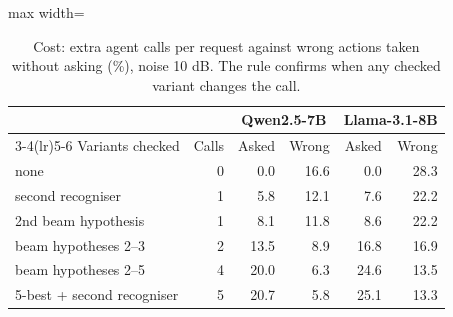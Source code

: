 \begin{table}[t]\centering\small\setlength{\tabcolsep}{4pt}
\begin{adjustbox}{max width=\linewidth}\begin{tabular}{lrrrrr}\toprule
 & & \multicolumn{2}{c}{Qwen2.5-7B} & \multicolumn{2}{c}{Llama-3.1-8B} \\ \cmidrule(lr){3-4}\cmidrule(lr){5-6}
Variants checked & Calls & Asked & Wrong & Asked & Wrong \\ \midrule
none & 0 & 0.0 & 16.6 & 0.0 & 28.3 \\
second recogniser & 1 & 5.8 & 12.1 & 7.6 & 22.2 \\
2nd beam hypothesis & 1 & 8.1 & 11.8 & 8.6 & 22.2 \\
beam hypotheses 2--3 & 2 & 13.5 & 8.9 & 16.8 & 16.9 \\
beam hypotheses 2--5 & 4 & 20.0 & 6.3 & 24.6 & 13.5 \\
5-best + second recogniser & 5 & 20.7 & 5.8 & 25.1 & 13.3 \\
\bottomrule\end{tabular}\end{adjustbox}
\caption{Cost: extra agent calls per request against wrong actions taken without asking (\%), noise 10 dB. The rule confirms when any checked variant changes the call.}\label{tab:cost}
\end{table}

